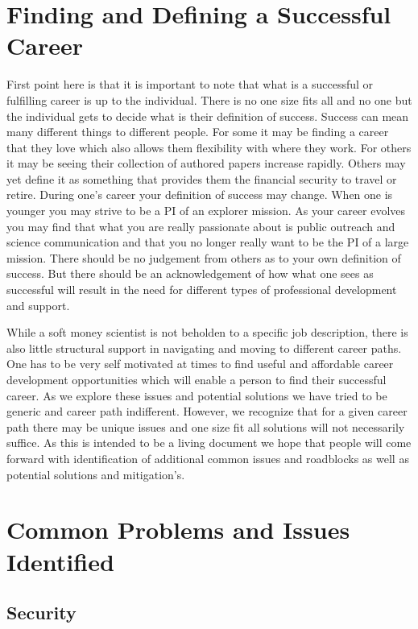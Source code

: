\documentclass[letterpaper, 12pt]{article}
\begin{document}
\section{Finding and Defining a Successful Career}
First point here is that it is important to note that what is a successful or fulfilling career is up to the individual. There is no one size fits all and no one but the individual gets to decide what is their definition of success. Success can mean many different things to different people. For some it may be finding a career that they love which also allows them flexibility with where they work. For others it may be seeing their collection of authored papers increase rapidly. Others may yet define it as something that provides them the financial security to travel or retire. During one’s career your definition of success may change. When one is younger you may strive to be a PI of an explorer mission. As your career evolves you may find that what you are really passionate about is public outreach and science communication and that you no longer really want to be the PI of a large mission. There should be no judgement from others as to your own definition of success. But there should be an acknowledgement of how what one sees as successful will result in the need for different types of professional development and support. 

While a soft money scientist is not beholden to a specific job description, there is also little structural support in navigating and moving to different career paths. One has to be very self motivated at times to find useful and affordable career development opportunities which will enable a person to find their successful career. As we explore these issues and potential solutions we have tried to be generic and career path indifferent. However, we recognize that for a given career path there may be unique issues and one size fit all solutions will not necessarily suffice. As this is intended to be a living document we hope that people will come forward with identification of additional common issues and roadblocks as well as potential solutions and mitigation's.


\section{Common Problems and Issues Identified}
\subsection{Security}
\end{document}
